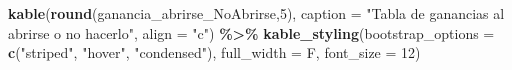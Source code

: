 \documentclass[12pt,a4paper,]{book}
\newenvironment{Shaded}{\begin{snugshade}}{\end{snugshade}}
\newcommand{\AttributeTok}[1]{\textcolor[rgb]{0.13,0.29,0.53}{#1}}
\newcommand{\DecValTok}[1]{\textcolor[rgb]{0.00,0.00,0.81}{#1}}
\newcommand{\FunctionTok}[1]{\textcolor[rgb]{0.13,0.29,0.53}{\textbf{#1}}}
\newcommand{\NormalTok}[1]{#1}
\newcommand{\SpecialCharTok}[1]{\textcolor[rgb]{0.81,0.36,0.00}{\textbf{#1}}}
\newcommand{\StringTok}[1]{\textcolor[rgb]{0.31,0.60,0.02}{#1}}
\numberwithin{dummy}{section}
\theoremstyle{ocrenumbox}
\theoremstyle{blacknumex}
\theoremstyle{blacknumbox}
\theoremstyle{ocrenum}
\theoremstyle{ocrenum}
\begin{document}
\begin{Shaded}
\begin{Highlighting}[]
\FunctionTok{kable}\NormalTok{(}\FunctionTok{round}\NormalTok{(ganancia\_abrirse\_NoAbrirse,}\DecValTok{5}\NormalTok{), }
      \AttributeTok{caption =} \StringTok{"Tabla de ganancias al abrirse o no hacerlo"}\NormalTok{,}
      \AttributeTok{align =} \StringTok{"c"}\NormalTok{) }\SpecialCharTok{\%\textgreater{}\%}
\FunctionTok{kable\_styling}\NormalTok{(}\AttributeTok{bootstrap\_options =} \FunctionTok{c}\NormalTok{(}\StringTok{"striped"}\NormalTok{, }\StringTok{"hover"}\NormalTok{, }\StringTok{"condensed"}\NormalTok{),}
              \AttributeTok{full\_width =}\NormalTok{ F, }\AttributeTok{font\_size =} \DecValTok{12}\NormalTok{)}
\end{Highlighting}
\end{Shaded}





%
\end{document}
